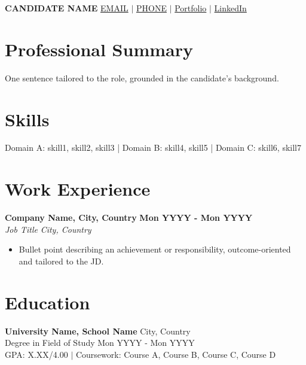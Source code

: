 \documentclass[9pt,letterpaper]{article}
\begin{document}
\pagestyle{empty}

\noindent
{\LARGE \textbf{CANDIDATE NAME}} \hfill \href{mailto:EMAIL}{EMAIL} $|$ \href{tel:PHONE}{PHONE} $|$ \href{PORTFOLIO_URL}{Portfolio} $|$ \href{LINKEDIN_URL}{LinkedIn}

\section*{Professional Summary}
One sentence tailored to the role, grounded in the candidate's background.

\section*{Skills}
Domain A: skill1, skill2, skill3 | Domain B: skill4, skill5 | Domain C: skill6, skill7

\section*{Work Experience}
\noindent
\textbf{Company Name, City, Country} \hfill \textbf{Mon YYYY - Mon YYYY} \\
\textit{Job Title} \hfill \textit{City, Country}
\vspace{-2pt}
\begin{itemize}
    \item Bullet point describing an achievement or responsibility, outcome-oriented and tailored to the JD.
\end{itemize}

\section*{Education}
\noindent
\textbf{University Name, School Name} \hfill City, Country \\
Degree in Field of Study \hfill Mon YYYY - Mon YYYY \\
GPA: X.XX/4.00 $|$ Coursework: Course A, Course B, Course C, Course D \\
\vspace{4pt}
\end{document}
